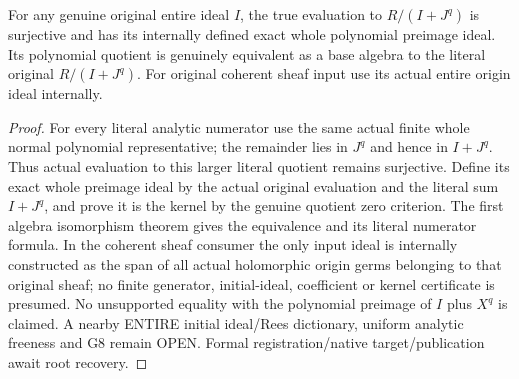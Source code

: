 \begin{theorem}
\label{hir:relative-normal-polynomial-jets-original-relative-quotient}
\leanok
{}
For any genuine original entire ideal $I$, the true evaluation to $R/(I+J^q)$ is surjective and has its internally defined exact whole polynomial preimage ideal. Its polynomial quotient is genuinely equivalent as a base algebra to the literal original $R/(I+J^q)$. For original coherent sheaf input use its actual entire origin ideal internally.
\end{theorem}
\begin{proof}
For every literal analytic numerator use the same actual finite whole normal polynomial representative; the remainder lies in $J^q$ and hence in $I+J^q$. Thus actual evaluation to this larger literal quotient remains surjective. Define its exact whole preimage ideal by the actual original evaluation and the literal sum $I+J^q$, and prove it is the kernel by the genuine quotient zero criterion. The first algebra isomorphism theorem gives the equivalence and its literal numerator formula. In the coherent sheaf consumer the only input ideal is internally constructed as the span of all actual holomorphic origin germs belonging to that original sheaf; no finite generator, initial-ideal, coefficient or kernel certificate is presumed. No unsupported equality with the polynomial preimage of $I$ plus $X^q$ is claimed. A nearby ENTIRE initial ideal/Rees dictionary, uniform analytic freeness and G8 remain OPEN. Formal registration/native target/publication await root recovery.
\end{proof}
